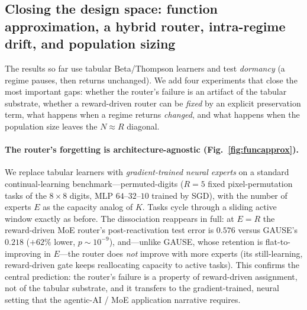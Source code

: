 \documentclass{article}
\begin{document}
\subsection{Closing the design space: function approximation, a hybrid router,
intra-regime drift, and population sizing}
\label{sec:closing}

The results so far use tabular Beta/Thompson learners and test \emph{dormancy} (a
regime pauses, then returns unchanged). We add four experiments that close the most
important gaps: whether the router's failure is an artifact of the tabular substrate,
whether a reward-driven router can be \emph{fixed} by an explicit preservation term,
what happens when a regime returns \emph{changed}, and what happens when the
population size leaves the $N\approx R$ diagonal.

\paragraph{The router's forgetting is architecture-agnostic
(Fig.~\ref{fig:funcapprox}).} We replace tabular learners with \emph{gradient-trained
neural experts} on a standard continual-learning benchmark---permuted-digits ($R{=}5$
fixed pixel-permutation tasks of the $8\times8$ digits, MLP $64$--$32$--$10$ trained by
SGD), with the number of experts $E$ as the capacity analog of $K$. Tasks cycle through
a sliding active window exactly as before. The dissociation reappears in full: at
$E{=}R$ the reward-driven MoE router's post-reactivation test error is $0.576$ versus
GAUSE's $0.218$ ($+62\%$ lower, $p\sim10^{-9}$), and---unlike GAUSE, whose retention is
flat-to-improving in $E$---the router does \emph{not} improve with more experts
(its still-learning, reward-driven gate keeps reallocating capacity to active tasks).
This confirms the central prediction: the router's failure is a property of
reward-driven assignment, not of the tabular substrate, and it transfers to the
gradient-trained, neural setting that the agentic-AI / MoE application narrative
requires.
\end{document}
